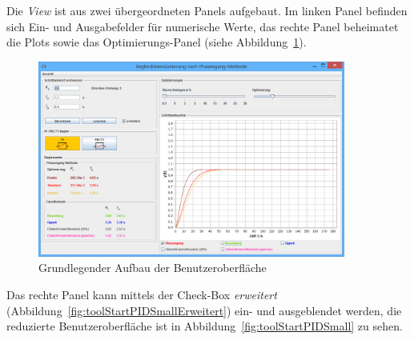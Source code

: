 Die  \emph{View} ist  aus  zwei \"ubergeordneten  Panels aufgebaut. Im  linken
Panel  befinden  sich  Ein-  und Ausgabefelder  f\"ur  numerische  Werte,  das
rechte  Panel  beheimatet  die   Plots  sowie  das  Optimierungs-Panel  (siehe
Abbildung~\ref{fig:toolStartPI}).

\begin{figure}[h!, width=\pagewidth]
    \centering
    \includegraphics[width=0.9\textwidth]{images/toolStartPI.jpg}
    \caption{Grundlegender Aufbau der Benutzeroberfl\"ache}
    \label{fig:toolStartPI}
\end{figure}

Das    rechte   Panel    kann   mittels    der   Check-Box    \emph{erweitert}
(Abbildung~\ref{fig:toolStartPIDSmallErweitert})    ein-   und    ausgeblendet
werden,       die      reduzierte       Benutzeroberfl\"ache      ist       in
Abbildung~\ref{fig:toolStartPIDSmall} zu sehen.


